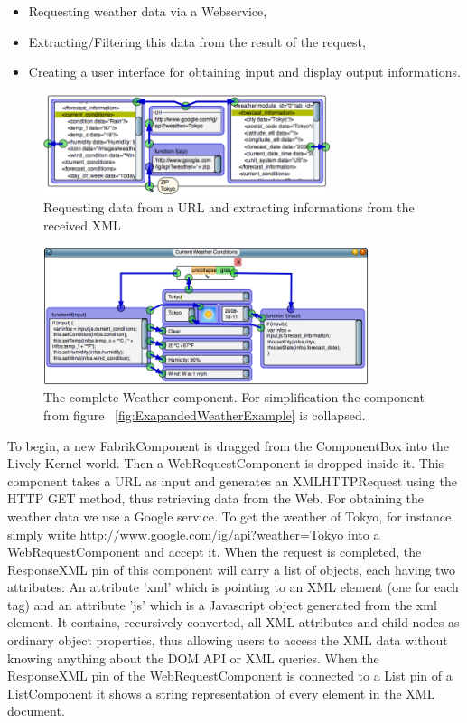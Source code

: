 \documentclass[pdftex, times, 10pt, twocolumn]{article}
\begin{document}
\begin{itemize}
  \item Requesting weather data via a Webservice, 
  \item Extracting/Filtering this data from the result of the request, 
  \item Creating a user interface for obtaining input and display output informations. 
\end{itemize}


\begin{figure}[t]\centering
\includegraphics[width=0.750000\textwidth]{weatherExample09.png} 

\caption{Requesting data from a URL and extracting informations from the received XML }
\label{fig:WebrequestInWeatherExample}
\end{figure}


\begin{figure}[]\centering
\includegraphics[width=0.850000\textwidth]{weatherExample07.png} 

\caption{The complete Weather component. For simplification the component from figure ~\ref{fig:ExapandedWeatherExample} is collapsed. }
\label{fig:ExapandedSimplifiedWeatherExample}
\end{figure}
To begin, a new FabrikComponent is dragged from the ComponentBox into the Lively Kernel world. Then a WebRequestComponent is dropped inside it. This component takes a URL as input and generates an XMLHTTPRequest using the HTTP GET method, thus retrieving data from the Web. For obtaining the weather data we use a Google service. To get the weather of Tokyo, for instance, simply write http://www.google.com/ig/api?weather=Tokyo into a WebRequestComponent and accept it. When the request is completed, the ResponseXML pin of this component will carry a list of objects, each having two attributes: An attribute 'xml' which is pointing to an XML element (one for each tag) and an attribute 'js' which is a Javascript object generated from the xml element. It contains, recursively converted, all XML attributes and child nodes as ordinary object properties, thus allowing users to access the XML data without knowing anything about the DOM API or XML queries. When the ResponseXML pin of the WebRequestComponent is connected to a List pin of a ListComponent it shows a string representation of every element in the XML document. 
\end{document}
